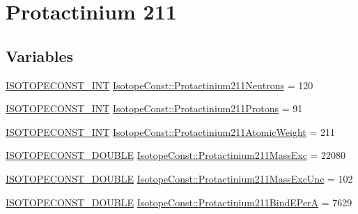 \hypertarget{group___isotope_const-_protactinium-_pa211}{}\section{Protactinium 211}
\label{group___isotope_const-_protactinium-_pa211}
\subsection*{Variables}
\begin{DoxyCompactItemize}
\item 
\mbox{\hyperlink{group___isotope_const-_macros_ga5f18360b3e99483a35c32d789e62621c}{I\+S\+O\+T\+O\+P\+E\+C\+O\+N\+S\+T\+\_\+\+I\+NT}} \mbox{\hyperlink{group___isotope_const-_protactinium-_pa211_gaa030bd01ce760a2f13d767947d52f6b0}{Isotope\+Const\+::\+Protactinium211\+Neutrons}} = 120
\item 
\mbox{\hyperlink{group___isotope_const-_macros_ga5f18360b3e99483a35c32d789e62621c}{I\+S\+O\+T\+O\+P\+E\+C\+O\+N\+S\+T\+\_\+\+I\+NT}} \mbox{\hyperlink{group___isotope_const-_protactinium-_pa211_ga734a318e0095d03597043b2b1640df6d}{Isotope\+Const\+::\+Protactinium211\+Protons}} = 91
\item 
\mbox{\hyperlink{group___isotope_const-_macros_ga5f18360b3e99483a35c32d789e62621c}{I\+S\+O\+T\+O\+P\+E\+C\+O\+N\+S\+T\+\_\+\+I\+NT}} \mbox{\hyperlink{group___isotope_const-_protactinium-_pa211_ga113da984e119faa256d6c3315f7f9936}{Isotope\+Const\+::\+Protactinium211\+Atomic\+Weight}} = 211
\item 
\mbox{\hyperlink{group___isotope_const-_macros_ga8f45a7272ce02c0b4c65c44636ed719a}{I\+S\+O\+T\+O\+P\+E\+C\+O\+N\+S\+T\+\_\+\+D\+O\+U\+B\+LE}} \mbox{\hyperlink{group___isotope_const-_protactinium-_pa211_ga38d5e0f6633fedf923d044a1b552395f}{Isotope\+Const\+::\+Protactinium211\+Mass\+Exc}} = 22080
\item 
\mbox{\hyperlink{group___isotope_const-_macros_ga8f45a7272ce02c0b4c65c44636ed719a}{I\+S\+O\+T\+O\+P\+E\+C\+O\+N\+S\+T\+\_\+\+D\+O\+U\+B\+LE}} \mbox{\hyperlink{group___isotope_const-_protactinium-_pa211_ga8330b9bfd37bd311bd531108ef00ca90}{Isotope\+Const\+::\+Protactinium211\+Mass\+Exc\+Unc}} = 102
\item 
\mbox{\hyperlink{group___isotope_const-_macros_ga8f45a7272ce02c0b4c65c44636ed719a}{I\+S\+O\+T\+O\+P\+E\+C\+O\+N\+S\+T\+\_\+\+D\+O\+U\+B\+LE}} \mbox{\hyperlink{group___isotope_const-_protactinium-_pa211_ga96d32d2430bc84d56e7e471b3262e6bb}{Isotope\+Const\+::\+Protactinium211\+Bind\+E\+PerA}} = 7629

\end{DoxyCompactItemize}
